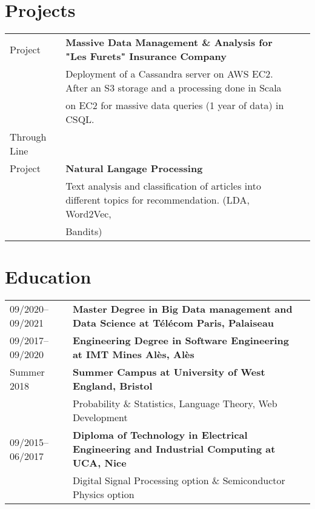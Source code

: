 \documentclass[9pt]{article}
\begin{document}
    \section*{Projects}
    \begin{tabular}{lll}
        Project&{\bf Massive Data Management \& Analysis for "Les Furets" Insurance Company}\\
        &Deployment of a Cassandra server on AWS EC2. After an S3 storage and a processing done in Scala\\
        &on EC2 for massive data queries (1 year of data) in CSQL.\\
        Through Line \\ Project&{\bf Natural Langage Processing}\\
        &Text analysis and classification of articles into different topics for recommendation. (LDA, Word2Vec,\\
        &Bandits)\\
    \end{tabular}

    \section*{Education}
    \begin{tabular}{lll}
        09/2020--09/2021&{\bf Master Degree in Big Data management and Data Science at Télécom Paris, Palaiseau}\\
        09/2017--09/2020&{\bf Engineering Degree in Software Engineering at IMT Mines Alès, Alès}\\
        Summer 2018&{\bf Summer Campus at University of West England, Bristol}\\
        & Probability \& Statistics, Language Theory, Web Development\\
        09/2015--06/2017&{\bf Diploma of Technology in Electrical Engineering and Industrial Computing at UCA, Nice}\\
        &Digital Signal Processing option \& Semiconductor Physics option
    \end{tabular}
\end{document}

